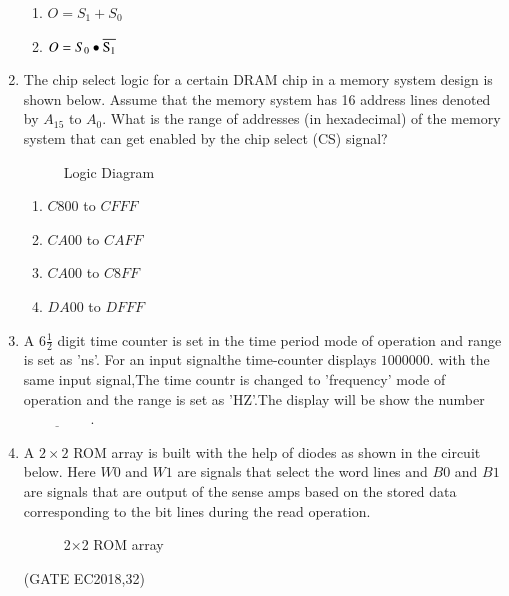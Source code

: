 \begin{enumerate}
\begin{enumerate}
		      \item  $O=S_1 + S_0$

		      \item $O=S_0\bullet\overline{\rm S _1}$
	      \end{enumerate}
	\item  The chip select logic for a certain DRAM chip in a memory system design is shown below. Assume that the memory system has 16 address lines denoted by ${A_{15}}$ to ${A_0}$. What is the range of addresses (in hexadecimal) of the memory system that can get enabled by the chip select (CS) signal?
	      \hfill{}

	      \begin{figure}[H]
		      
		      \caption{Logic Diagram}
		      \label{fig:figure14}
	      \end{figure}

	      \begin{enumerate}
		      \item ${C800}$ to ${CFFF}$
		      \item ${CA00}$ to ${CAFF}$
		      \item ${CA00}$ to ${C8FF}$
		      \item ${DA00}$ to ${DFFF}$
	      \end{enumerate}


	\item A $6{\frac{1}{2}}$ digit time counter is set in the time period mode of operation and range is set as 'ns'. For an input signalthe time-counter displays $1000000$. with the same input signal,The time countr is changed to 'frequency' mode of operation and the range is set as 'HZ'.The display will be show the number$\underline{\hspace{2cm}}$.
	      \hfill{}


	\item  A $2\times2$ ROM array is built with the help of diodes as shown in the circuit below. Here $W0$ and $W1$ are signals that select the word lines and $B0$ and $B1$ are signals that are output of the sense amps based on the stored data corresponding to the bit lines during the read operation.

	      \begin{figure}[H]
		      \centering
		      
		      \caption{ 2×2 ROM array}

	      \end{figure}
	      \hfill(GATE EC2018,32)


\end{enumerate}
